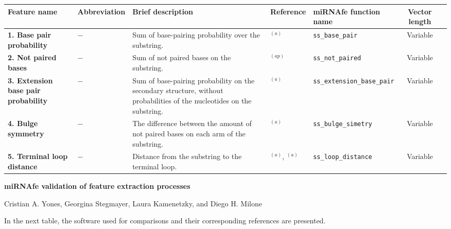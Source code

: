\documentclass[a4paper,10pt]{article}
\renewcommand*{\arraystretch}{2.4}
\begin{document}
\small
\begin{longtable}{ >{\raggedright\arraybackslash}p{4.2cm}  p{1.6cm}  p{5.6cm}  p{1.8cm}  l  cp{1cm} }
 \toprule
 Feature name & Abbreviation & \centering Brief description & Reference & miRNAfe function name  & Vector length \\
 \midrule
 \endhead
 \bottomrule
 \endlastfoot

\bfseries{1. Base pair probability} & $-$ &  Sum of base-pairing probability over the substring. & \cite{LN03}$^{(a)}$ & \verb|ss_base_pair| & Variable \\

\bfseries{2. Not paired bases} & $-$ &  Sum of not paired bases on the substring. & \cite{MM09}$^{(ap)}$ & \verb|ss_not_paired| & Variable \\

\bfseries{3. Extension base pair probability} & $-$ & Sum of base-pairing probability on the secondary structure, without probabilities of the nucleotides on the substring. & \cite{LN03}$^{(a)}$ & \verb|ss_extension_base_pair| & Variable \\

\bfseries{4. Bulge symmetry} & $-$ &  The difference between the amount of not paired bases on each arm of the substring.& \cite{LN03}$^{(a)}$ & \verb|ss_bulge_simetry| & Variable \\

\bfseries{5. Terminal loop distance} & $-$ &  Distance from the substring to the terminal loop. & \cite{LN03}$^{(a)}$, \cite{SH07}$^{(a)}$ & \verb|ss_loop_distance| & Variable \\

\end{longtable}

\newpage


\renewcommand*{\arraystretch}{1.5}


\begin{center}
{\LARGE \textbf{miRNAfe validation of feature extraction processes}}

{Cristian A. Yones, Georgina Stegmayer, Laura Kamenetzky, and Diego H. Milone}
\end{center}

\vspace{0.2cm}

In the next table, the software used for comparisons and their corresponding references are presented.

\vspace{0.4cm}
\end{document}
